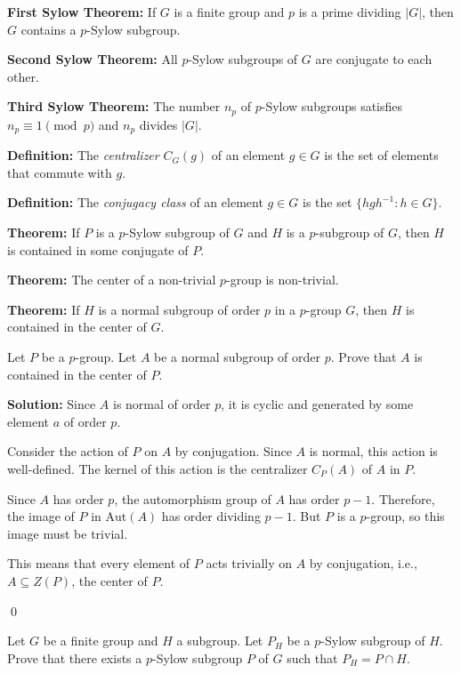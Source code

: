 \textbf{First Sylow Theorem:} If $G$ is a finite group and $p$ is a prime dividing $|G|$, then $G$ contains a $p$-Sylow subgroup.

\textbf{Second Sylow Theorem:} All $p$-Sylow subgroups of $G$ are conjugate to each other.

\textbf{Third Sylow Theorem:} The number $n_p$ of $p$-Sylow subgroups satisfies $n_p \equiv 1 \pmod{p}$ and $n_p$ divides $|G|$.

\textbf{Definition:} The \textit{centralizer} $C_G(g)$ of an element $g \in G$ is the set of elements that commute with $g$.

\textbf{Definition:} The \textit{conjugacy class} of an element $g \in G$ is the set $\{hgh^{-1} : h \in G\}$.

\textbf{Theorem:} If $P$ is a $p$-Sylow subgroup of $G$ and $H$ is a $p$-subgroup of $G$, then $H$ is contained in some conjugate of $P$.

\textbf{Theorem:} The center of a non-trivial $p$-group is non-trivial.

\textbf{Theorem:} If $H$ is a normal subgroup of order $p$ in a $p$-group $G$, then $H$ is contained in the center of $G$.

\begin{problembox}
Let $P$ be a $p$-group. Let $A$ be a normal subgroup of order $p$. Prove that $A$ is contained in the center of $P$.
\end{problembox}

\noindent\textbf{Solution:} Since $A$ is normal of order $p$, it is cyclic and generated by some element $a$ of order $p$. 

Consider the action of $P$ on $A$ by conjugation. Since $A$ is normal, this action is well-defined. The kernel of this action is the centralizer $C_P(A)$ of $A$ in $P$.

Since $A$ has order $p$, the automorphism group of $A$ has order $p-1$. Therefore, the image of $P$ in $\text{Aut}(A)$ has order dividing $p-1$. But $P$ is a $p$-group, so this image must be trivial.

This means that every element of $P$ acts trivially on $A$ by conjugation, i.e., $A \subseteq Z(P)$, the center of $P$.


\qed
\begin{problembox}
Let $G$ be a finite group and $H$ a subgroup. Let $P_H$ be a $p$-Sylow subgroup of $H$. Prove that there exists a $p$-Sylow subgroup $P$ of $G$ such that $P_H = P \cap H$.
\end{problembox}

